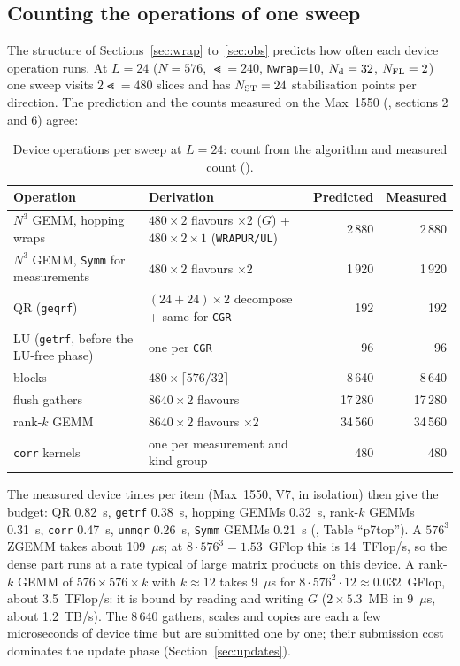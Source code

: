\subsection{Counting the operations of one sweep}

The structure of Sections~\ref{sec:wrap} to~\ref{sec:obs} predicts how often each device operation runs. At $L=24$ ($N=576$, $\Lt=240$, \texttt{Nwrap}=10, $N_{\rm d}=32$, $N_{\rm FL}=2$) one sweep visits $2\Lt=480$ slices and has $N_{\rm ST}=24$ stabilisation points per direction. The prediction and the counts measured on the Max~1550 (, sections 2 and 6) agree:

\begin{table}[h]
\centering\small
\caption{Device operations per sweep at $L=24$: count from the algorithm and measured count ().}
\label{tab:count}
\begin{tabular}{@{}llrr@{}}
\toprule
Operation & Derivation & Predicted & Measured \\
\midrule
$N^3$ GEMM, hopping wraps & $480\times2$ flavours $\times2$ ($G$) + $480\times2\times1$ (\texttt{WRAPUR/UL}) & 2\,880 & 2\,880 \\
$N^3$ GEMM, \texttt{Symm} for measurements & $480\times2$ flavours $\times2$ & 1\,920 & 1\,920 \\
QR (\texttt{geqrf}) & $(24+24)\times2$ decompose + same for \texttt{CGR} & 192 & 192 \\
LU (\texttt{getrf}, before the LU-free phase) & one per \texttt{CGR} & 96 & 96 \\
blocks & $480\times\lceil576/32\rceil$ & 8\,640 & 8\,640 \\
flush gathers & $8640\times2$ flavours & 17\,280 & 17\,280 \\
rank-$k$ GEMM & $8640\times2$ flavours $\times2$ & 34\,560 & 34\,560 \\
\texttt{corr} kernels & one per measurement and kind group & 480 & 480 \\
\bottomrule
\end{tabular}
\end{table}

The measured device times per item (Max~1550, V7, in isolation) then give the budget: QR 0.82~s, \texttt{getrf} 0.38~s, hopping GEMMs 0.32~s, rank-$k$ GEMMs 0.31~s, \texttt{corr} 0.47~s, \texttt{unmqr} 0.26~s, \texttt{Symm} GEMMs 0.21~s (, Table ``p7top''). %
A $576^3$ ZGEMM takes about 109~$\mu$s; at $8\cdot576^3=1.53$~GFlop this is 14~TFlop/s, so the dense part runs at a rate typical of large matrix products on this device. A rank-$k$ GEMM of $576\times576\times k$ with $k\approx12$ takes 9~$\mu$s for $8\cdot576^2\cdot12\approx0.032$~GFlop, about 3.5~TFlop/s: it is bound by reading and writing $G$ ($2\times5.3$~MB in 9~$\mu$s, about 1.2~TB/s). The 8\,640 gathers, scales and copies are each a few microseconds of device time but are submitted one by one; their submission cost dominates the update phase (Section~\ref{sec:updates}).
